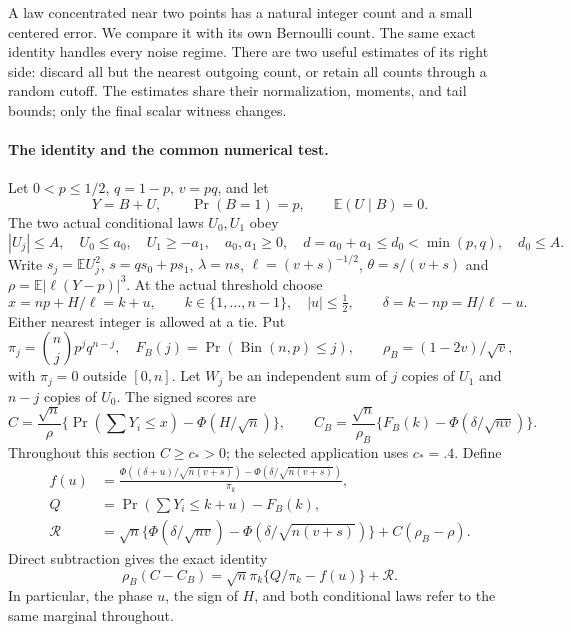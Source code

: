 A law concentrated near two points has a natural integer count and a small
centered error. We compare it with its own Bernoulli count. The same exact
identity handles every noise regime. There are two useful estimates of its
right side: discard all but the nearest outgoing count, or retain all counts
through a random cutoff. The estimates share their normalization, moments,
and tail bounds; only the final scalar witness changes.

\paragraph{The identity and the common numerical test.}

Let $0<p\le1/2$, $q=1-p$, $v=pq$, and let
\[
 Y=B+U,\qquad \Pr(B=1)=p,\qquad \mathbb E(U\mid B)=0.
\]
The two actual conditional laws $U_0,U_1$ obey
\begin{equation}\label{j:local:shortloc:support}
 |U_j|\le A,\quad U_0\le a_0,\quad U_1\ge-a_1,\quad
 a_0,a_1\ge0,\quad d=a_0+a_1\le d_0<\min(p,q),\quad d_0\le A.
\end{equation}
Write $s_j=\mathbb E U_j^2$, $s=qs_0+ps_1$, $\lambda=ns$,
$\ell=(v+s)^{-1/2}$, $\theta=s/(v+s)$ and
$\rho=\mathbb E|\ell(Y-p)|^3$. At the actual threshold choose
\[
 x=np+H/\ell=k+u,\qquad k\in\{1,\ldots,n-1\},\quad |u|\le\tfrac12,
 \qquad \delta=k-np=H/\ell-u.
\]
Either nearest integer is allowed at a tie. Put
\[
 \pi_j=\binom njp^jq^{n-j},\quad F_B(j)=\Pr(\operatorname{Bin}(n,p)\le j),
 \qquad \rho_B=(1-2v)/\sqrt v,
\]
with $\pi_j=0$ outside $[0,n]$. Let $W_j$ be an independent sum of $j$
copies of $U_1$ and $n-j$ copies of $U_0$. The signed scores are
\[
 C=\frac{\sqrt n}{\rho}\{\Pr(\textstyle\sum Y_i\le x)-\Phi(H/\sqrt n)\},
 \qquad C_B=\frac{\sqrt n}{\rho_B}\{F_B(k)-\Phi(\delta/\sqrt{nv})\}.
\]
Throughout this section $C\ge c_*>0$; the selected application uses $c_*=.4$.
Define
\begin{align}
 f(u)&=\frac{\Phi((\delta+u)/\sqrt{n(v+s)})-
                    \Phi(\delta/\sqrt{n(v+s)})}{\pi_k},\label{j:local:shortloc:f}\\
 Q&=\Pr(\textstyle\sum Y_i\le k+u)-F_B(k),\nonumber\\
 \mathcal R&=\sqrt n\{\Phi(\delta/\sqrt{nv})-
                 \Phi(\delta/\sqrt{n(v+s)})\}+C(\rho_B-\rho).\nonumber
\end{align}
Direct subtraction gives the exact identity
\begin{equation}\label{j:local:shortloc:master}
 \rho_B(C-C_B)=\sqrt n\pi_k\{Q/\pi_k-f(u)\}+\mathcal R.
\end{equation}
In particular, the phase $u$, the sign of $H$, and both conditional laws
refer to the same marginal throughout.

